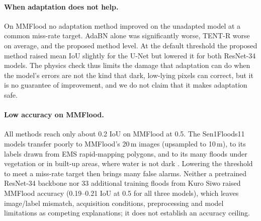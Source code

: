 \documentclass[a4paper,fleqn]{cas-sc}
\begin{document}
\paragraph{When adaptation does not help.} On MMFlood no adaptation method improved on the unadapted model at a common miss-rate target. AdaBN alone was significantly worse, TENT-R worse on average, and the proposed method level. At the default threshold the proposed method raised mean IoU slightly for the U-Net but lowered it for both ResNet-34 models. The physics check thus limits the damage that adaptation can do when the model's errors are not the kind that dark, low-lying pixels can correct, but it is no guarantee of improvement, and we do not claim that it makes adaptation safe.

\paragraph{Low accuracy on MMFlood.} All methods reach only about 0.2 IoU on MMFlood at 0.5. The Sen1Floods11 models transfer poorly to MMFlood's 20\,m images (upsampled to 10\,m), to its labels drawn from EMS rapid-mapping polygons, and to its many floods under vegetation or in built-up areas, where water is not dark \citep{tsyganskaya2018vegetation,zhao2024urbansarfloods}. Lowering the threshold to meet a miss-rate target then brings many false alarms. Neither a pretrained ResNet-34 backbone nor 33 additional training floods from Kuro Siwo raised MMFlood accuracy (0.19--0.21 IoU at 0.5 for all three models), which leaves image/label mismatch, acquisition conditions, preprocessing and model limitations as competing explanations; it does not establish an accuracy ceiling.
\end{document}
